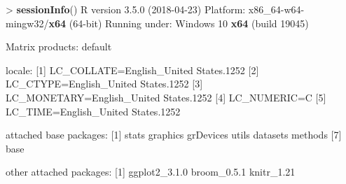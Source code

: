 \documentclass[]{article}
\newenvironment{Shaded}{\begin{snugshade}}{\end{snugshade}}
\newcommand{\KeywordTok}[1]{\textcolor[rgb]{0.13,0.29,0.53}{\textbf{{#1}}}}
\newcommand{\DecValTok}[1]{\textcolor[rgb]{0.00,0.00,0.81}{{#1}}}
\newcommand{\FloatTok}[1]{\textcolor[rgb]{0.00,0.00,0.81}{{#1}}}
\newcommand{\StringTok}[1]{\textcolor[rgb]{0.31,0.60,0.02}{{#1}}}
\newcommand{\NormalTok}[1]{{#1}}
\begin{document}
\begin{Shaded}
\begin{Highlighting}[]
\NormalTok{>}\StringTok{ }\KeywordTok{sessionInfo}\NormalTok{()}
\NormalTok{R version }\FloatTok{3.5.0} \NormalTok{(}\DecValTok{2018-04-23}\NormalTok{)}
\NormalTok{Platform:}\StringTok{ }\NormalTok{x86_64-w64-mingw32/}\KeywordTok{x64} \NormalTok{(}\DecValTok{64}\NormalTok{-bit)}
\NormalTok{Running under:}\StringTok{ }\NormalTok{Windows }\DecValTok{10} \KeywordTok{x64} \NormalTok{(build }\DecValTok{19045}\NormalTok{)}

\NormalTok{Matrix products:}\StringTok{ }\NormalTok{default}

\NormalTok{locale:}
\NormalTok{[}\DecValTok{1}\NormalTok{] LC_COLLATE=English_United States}\FloatTok{.1252} 
\NormalTok{[}\DecValTok{2}\NormalTok{] LC_CTYPE=English_United States}\FloatTok{.1252}   
\NormalTok{[}\DecValTok{3}\NormalTok{] LC_MONETARY=English_United States}\FloatTok{.1252}
\NormalTok{[}\DecValTok{4}\NormalTok{] LC_NUMERIC=C                          }
\NormalTok{[}\DecValTok{5}\NormalTok{] LC_TIME=English_United States}\FloatTok{.1252}    

\NormalTok{attached base packages:}
\NormalTok{[}\DecValTok{1}\NormalTok{] stats     graphics  grDevices utils     datasets  methods  }
\NormalTok{[}\DecValTok{7}\NormalTok{] base     }

\NormalTok{other attached packages:}
\NormalTok{[}\DecValTok{1}\NormalTok{] ggplot2_3}\FloatTok{.1.0} \NormalTok{broom_0}\FloatTok{.5.1}   \NormalTok{knitr_1}\FloatTok{.21}   


\end{Highlighting}
\end{Shaded}
\end{document}
